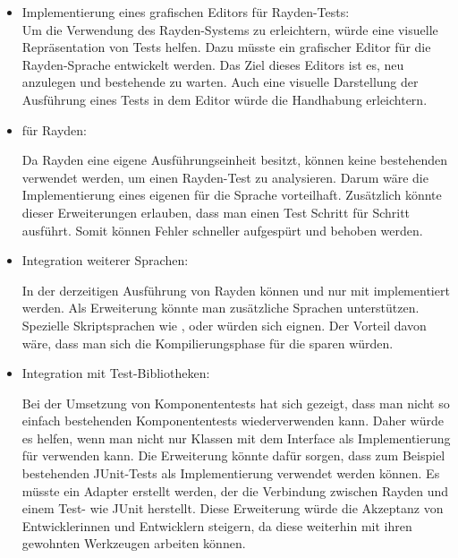 \begin{itemize}
\item Implementierung eines grafischen Editors für Rayden-Tests:\\

Um die Verwendung des Rayden-Systems zu erleichtern, würde eine visuelle Repräsentation von Tests helfen. Dazu müsste ein grafischer Editor für die Rayden-Sprache entwickelt werden. Das Ziel dieses Editors ist es, neu  anzulegen und bestehende zu warten. Auch eine visuelle Darstellung der Ausführung eines Tests in dem Editor würde die Handhabung erleichtern.\\

\item {} für Rayden:

Da Rayden eine eigene Ausführungseinheit besitzt, können keine bestehenden  verwendet werden, um einen Rayden-Test zu analysieren. Darum wäre die Implementierung eines eigenen  für die Sprache vorteilhaft. Zusätzlich könnte dieser Erweiterungen erlauben, dass man einen Test Schritt für Schritt ausführt. Somit können Fehler schneller aufgespürt und behoben werden.\\

\item Integration weiterer Sprachen:

In der derzeitigen Ausführung von Rayden können  und  nur mit  implementiert werden. Als Erweiterung könnte man zusätzliche Sprachen unterstützen. Spezielle Skriptsprachen wie ,  oder  würden sich eignen. Der Vorteil davon wäre, dass man sich die Kompilierungsphase für die  sparen würden. \\

\item Integration mit Test-Bibliotheken:

Bei der Umsetzung von Komponententests hat sich gezeigt, dass man nicht so einfach bestehenden Komponententests wiederverwenden kann. Daher würde es helfen, wenn man nicht nur Klassen mit dem Interface  als Implementierung für  verwenden kann. Die Erweiterung könnte dafür sorgen, dass zum Beispiel bestehenden JUnit-Tests als Implementierung verwendet werden können. Es müsste ein Adapter erstellt werden, der die Verbindung zwischen Rayden und einem Test- wie JUnit herstellt. Diese Erweiterung würde die Akzeptanz von Entwicklerinnen und Entwicklern steigern, da diese weiterhin mit ihren gewohnten Werkzeugen arbeiten können. 

\end{itemize}

